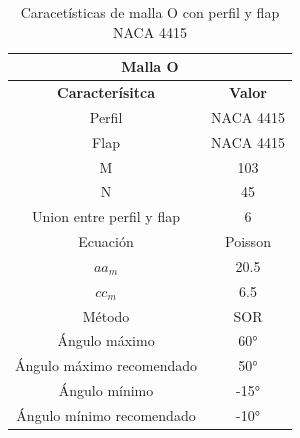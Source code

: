 \documentclass[letterpaper, openright, 12pt]{book}
\begin{document}
    \begin{table}[htbp!]
    \begin{center}
        \begin{tabular}{| c | c |}
        \hline
        \multicolumn{2}{|c|}{Malla O}\\

        \hline
        \textbf{Caracterísitca} & \textbf{Valor} \\ \hline

        Perfil & NACA 4415
        \\ \hline

        Flap & NACA 4415
        \\ \hline

        M & 103
        \\ \hline

        N & 45
        \\ \hline

        Union entre perfil y flap & 6
        \\ \hline

        Ecuación & Poisson
        \\\hline

        $aa_m$ & 20.5
        \\ \hline

        $cc_m$ & 6.5
        \\ \hline

        Método & SOR
        \\\hline

        Ángulo máximo & 60\si{\degree}
        \\ \hline

        Ángulo máximo recomendado & 50\si{\degree}
        \\ \hline

        Ángulo mínimo & -15\si{\degree}
        \\ \hline

        Ángulo mínimo recomendado & -10\si{\degree}
        \\ \hline
        \end{tabular}
        \caption{Caracetísticas de malla O con perfil y flap NACA 4415}
    \label{tabla_o_naca_4415_flap}
    \end{center}
    \end{table}
\end{document}
